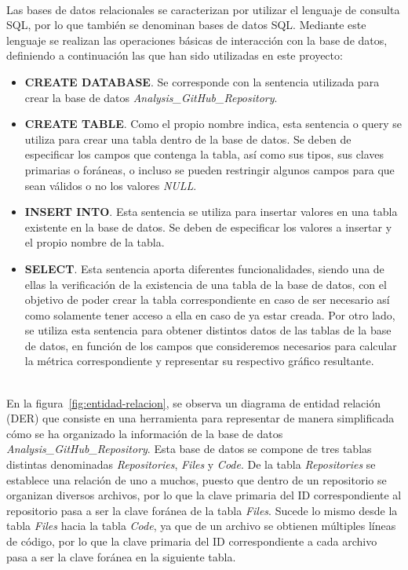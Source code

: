 \documentclass[a4paper, 12pt]{book}
\begin{document}
\\Las bases de datos relacionales se caracterizan por utilizar el lenguaje de consulta SQL, por lo que también se denominan bases de datos SQL. Mediante este lenguaje se realizan las operaciones básicas de interacción con la base de datos, definiendo a continuación las que han sido
utilizadas en este proyecto:
\begin{itemize}
  \item \textbf{CREATE DATABASE}. Se corresponde con la sentencia utilizada para crear la base de datos \textit{Analysis\_GitHub\_Repository}.
  \item \textbf{CREATE TABLE}. Como el propio nombre indica, esta sentencia o query se utiliza para crear una tabla dentro de la base de datos. Se deben de especificar los campos que contenga la tabla, así como sus tipos, sus claves primarias o foráneas, o incluso se pueden restringir
  algunos campos para que sean válidos o no los valores \textit{NULL}.
  \item \textbf{INSERT INTO}. Esta sentencia se utiliza para insertar valores en una tabla existente en la base de datos. Se deben de especificar los valores a insertar y el propio nombre de la tabla.
  \item \textbf{SELECT}. Esta sentencia aporta diferentes funcionalidades, siendo una de ellas la verificación de la existencia de una tabla de la base de datos, con el objetivo de poder crear la tabla correspondiente en caso de ser necesario así como solamente tener acceso a ella
  en caso de ya estar creada. Por otro lado, se utiliza esta sentencia para obtener distintos datos de las tablas de la base de datos, en función de los campos que consideremos necesarios para calcular la métrica correspondiente y representar su respectivo gráfico resultante.
\end{itemize}

\\En la figura~\ref{fig:entidad-relacion}, se observa un diagrama de entidad relación (DER) que consiste en una herramienta para representar de manera simplificada cómo se ha organizado la información de la base de datos \textit{Analysis\_GitHub\_Repository}. Esta base de datos se compone de tres tablas
distintas denominadas \textit{Repositories}, \textit{Files} y \textit{Code}. De la tabla \textit{Repositories} se establece una relación de uno a muchos, puesto que dentro de un repositorio se organizan diversos archivos, por lo que la clave primaria del ID correspondiente
al repositorio pasa a ser la clave foránea de la tabla \textit{Files}. Sucede lo mismo desde la tabla \textit{Files} hacia la tabla \textit{Code}, ya que de un archivo se obtienen múltiples líneas de código, por lo que la clave primaria del ID correspondiente a cada archivo
pasa a ser la clave foránea en la siguiente tabla.
\end{document}
